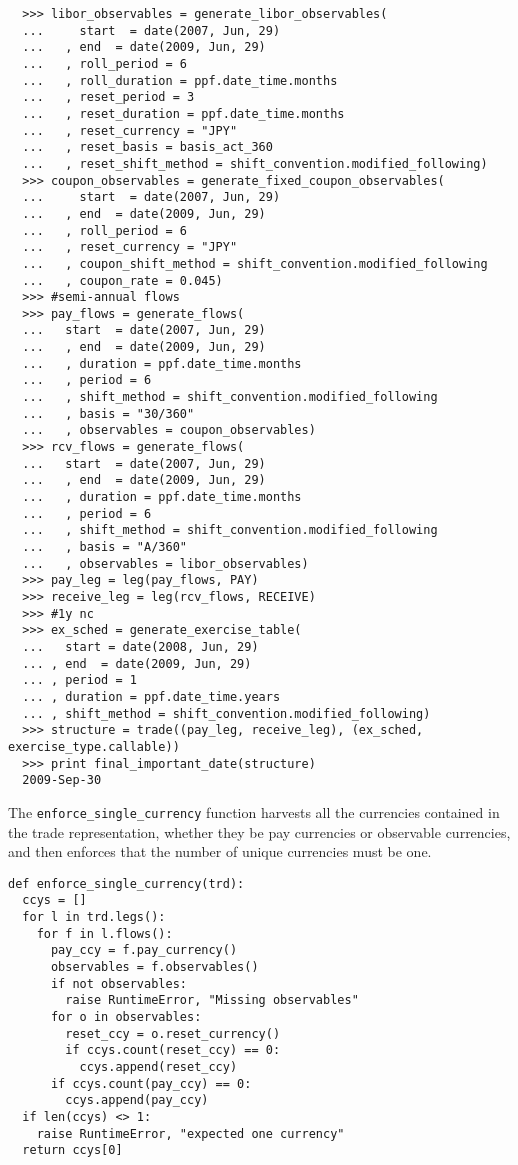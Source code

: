 \begin{verbatim}
  >>> libor_observables = generate_libor_observables(
  ...     start  = date(2007, Jun, 29)
  ...   , end  = date(2009, Jun, 29)
  ...   , roll_period = 6
  ...   , roll_duration = ppf.date_time.months
  ...   , reset_period = 3
  ...   , reset_duration = ppf.date_time.months
  ...   , reset_currency = "JPY"
  ...   , reset_basis = basis_act_360
  ...   , reset_shift_method = shift_convention.modified_following)
  >>> coupon_observables = generate_fixed_coupon_observables(
  ...     start  = date(2007, Jun, 29)
  ...   , end  = date(2009, Jun, 29)
  ...   , roll_period = 6
  ...   , reset_currency = "JPY"
  ...   , coupon_shift_method = shift_convention.modified_following
  ...   , coupon_rate = 0.045)
  >>> #semi-annual flows
  >>> pay_flows = generate_flows(
  ...   start  = date(2007, Jun, 29)
  ...   , end  = date(2009, Jun, 29)
  ...   , duration = ppf.date_time.months
  ...   , period = 6
  ...   , shift_method = shift_convention.modified_following
  ...   , basis = "30/360"
  ...   , observables = coupon_observables)
  >>> rcv_flows = generate_flows(
  ...   start  = date(2007, Jun, 29)
  ...   , end  = date(2009, Jun, 29)
  ...   , duration = ppf.date_time.months
  ...   , period = 6
  ...   , shift_method = shift_convention.modified_following
  ...   , basis = "A/360"
  ...   , observables = libor_observables)
  >>> pay_leg = leg(pay_flows, PAY)
  >>> receive_leg = leg(rcv_flows, RECEIVE)
  >>> #1y nc
  >>> ex_sched = generate_exercise_table(
  ...   start = date(2008, Jun, 29)
  ... , end  = date(2009, Jun, 29)
  ... , period = 1
  ... , duration = ppf.date_time.years
  ... , shift_method = shift_convention.modified_following)
  >>> structure = trade((pay_leg, receive_leg), (ex_sched, exercise_type.callable))
  >>> print final_important_date(structure)  
  2009-Sep-30
\end{verbatim}

The \verb|enforce_single_currency| function harvests all the
currencies contained in the trade representation, whether they be pay
currencies or observable currencies, and then enforces that the number
of unique currencies must be one.
\begin{verbatim}
def enforce_single_currency(trd):
  ccys = []
  for l in trd.legs():
    for f in l.flows():
      pay_ccy = f.pay_currency()
      observables = f.observables()
      if not observables:
        raise RuntimeError, "Missing observables"
      for o in observables:
        reset_ccy = o.reset_currency()
        if ccys.count(reset_ccy) == 0:
          ccys.append(reset_ccy)
      if ccys.count(pay_ccy) == 0:
        ccys.append(pay_ccy)
  if len(ccys) <> 1:
    raise RuntimeError, "expected one currency"  
  return ccys[0]
\end{verbatim}

